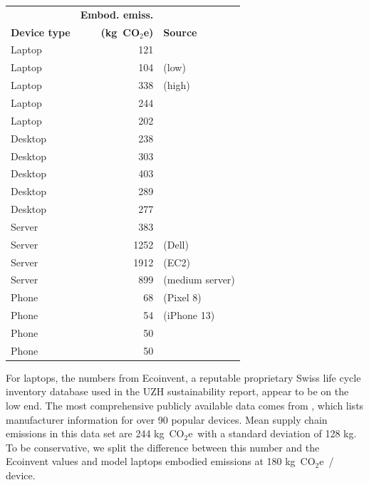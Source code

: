 \documentclass[11pt]{article}
\newcommand{\coe}{CO$_2$e}
\newcommand{\gcoe}{g~\coe}
\newcommand{\kgcoe}{k\gcoe}
\begin{document}
\begin{center}
  \begin{tabular}{|l|r|l|}
    \hline
    & \textbf{Embod. emiss.} & \\
    \textbf{Device type} & \textbf{(\kgcoe)} & \textbf{Source} \\ \hline
    Laptop & 121 & \textcite{ecoinvent}  \\ \hline
    Laptop & 104 & \textcite{teehan2013} (low) \\ \hline
    Laptop & 338 & \textcite{teehan2013} (high) \\ \hline
    Laptop & 244 & \textcite{rarecoil} \\ \hline
    Laptop & 202 & \textcite{unctadder2024} \\ \hline
    Desktop & 238 & \textcite{ecoinvent} \\ \hline
    Desktop & 303 & \textcite{teehan2013} \\ \hline
    Desktop & 403 & \textcite{unctadder2024} \\ \hline
    Desktop & 289 & \textcite{dellpcf} \\ \hline
    Desktop & 277 & \textcite{boavizta:api} \\ \hline
    Server & 383 & \textcite{teehan2013} \\ \hline
    Server & 1252 & \textcite{davy2021} (Dell) \\ \hline
    Server & 1912 & \textcite{davy2021} (EC2) \\ \hline
    Server & 899 & \textcite{boavizta:api} (medium server)\\ \hline
    Phone & 68 & \textcite{googlepixel8} (Pixel 8)\\ \hline
    Phone & 54 & \textcite{appleiphone13} (iPhone 13)\\ \hline
    Phone & 50 & \textcite{unctadder2024} \\ \hline
    Phone & 50 & \textcite{lovehagen2023} \\ \hline
    \end{tabular}
  \label{tab:embodied_emissions}
\end{center}

For laptops, the numbers from Ecoinvent, a reputable proprietary Swiss life cycle inventory database used in the UZH sustainability report, appear to be on the low end. The most comprehensive publicly available data comes from \textcite{rarecoil}, which lists manufacturer information for over 90 popular devices. Mean supply chain emissions in this data set are 244 \kgcoe\ with a standard deviation of 128 kg. To be conservative, we split the difference between this number and the Ecoinvent values and model laptops embodied emissions at 180 \kgcoe\ / device.
\end{document}
